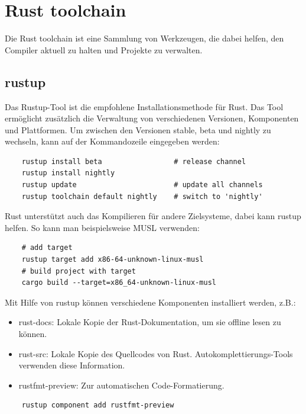 \chapter{Rust toolchain}

Die Rust toolchain ist eine Sammlung von Werkzeugen, die dabei helfen, den Compiler aktuell zu halten und Projekte zu verwalten.


\section{rustup}

Das Rustup-Tool ist die empfohlene Installationsmethode für Rust. Das Tool ermöglicht zusätzlich die Verwaltung von verschiedenen Versionen, Komponenten und Plattformen. Um zwischen den Versionen stable, beta und nightly zu wechseln, kann auf der Kommandozeile eingegeben werden: \cite{RustEdition}

\begin{lstlisting}   
    rustup install beta                 # release channel
    rustup install nightly
    rustup update                       # update all channels
    rustup toolchain default nightly    # switch to 'nightly'
\end{lstlisting}

Rust unterstützt auch das Kompilieren für andere Zielsysteme, dabei kann rustup helfen. So kann man beispielsweise MUSL verwenden:

\begin{lstlisting}
    # add target
    rustup target add x86-64-unknown-linux-musl
    # build project with target
    cargo build --target=x86_64-unknown-linux-musl
\end{lstlisting}

Mit Hilfe von rustup können verschiedene Komponenten installiert werden, z.B.:

\begin{itemize}
    \item rust-docs: Lokale Kopie der Rust-Dokumentation, um sie offline lesen zu können.
    \item rust-src: Lokale Kopie des Quellcodes von Rust. Autokomplettierungs-Tools verwenden diese Information.
    \item rustfmt-preview: Zur automatischen Code-Formatierung.
\end{itemize}

\begin{lstlisting}
    rustup component add rustfmt-preview
\end{lstlisting}


